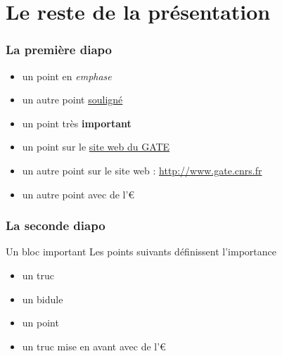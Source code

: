 \documentclass[10pt,t]{beamer}
\begin{document}

\section{Le reste de la présentation}


\begin{frame}
  \frametitle{La première diapo}
  
  
  \begin{itemize}
  \item un point en \emph{emphase}
  \item un autre point \underline{souligné}
  \item un point très \textbf{important}
  \end{itemize} 
  
  \pause  
  
  
  \begin{itemize}
  \item un point sur le \href{http://www.gate.cnrs.fr}{site web du GATE}
  \item un autre point sur le site web : \url{http://www.gate.cnrs.fr}
  \item un autre point avec de l'€
  \end{itemize} 
\end{frame}


\begin{frame}
  \frametitle{La seconde diapo}
  
  
  \begin{block}{Un bloc important}
    Les points suivants définissent l'importance
    \begin{itemize}
    \item un truc
    \item un bidule
    \end{itemize}
  \end{block}
  
  \pause  
  
  
  \begin{itemize}
  \item un point
  \item un truc mise en \alert{avant} avec de l'€
  \end{itemize} 
\end{frame}

\end{document}
